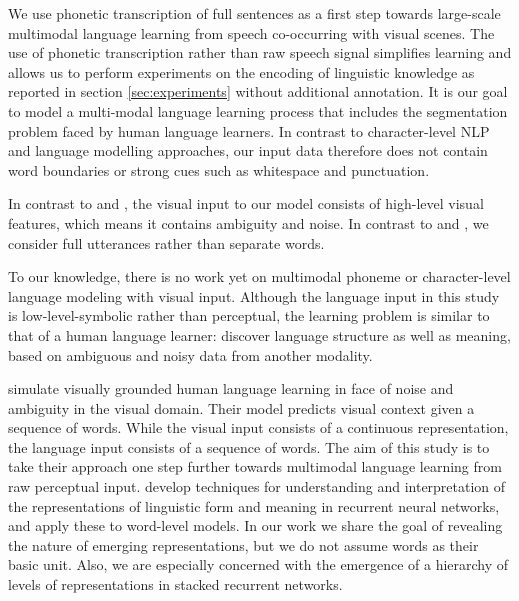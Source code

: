 We use phonetic transcription of full sentences as a first step
towards large-scale multimodal language learning from speech
co-occurring with visual scenes. 
The use of phonetic
transcription rather than raw speech signal simplifies learning
and allows us to perform experiments on the encoding of linguistic
knowledge as reported in section \ref{sec:experiments} without
additional annotation. It is our goal to model a multi-modal language learning process that includes the segmentation problem faced by human language learners. In contrast to character-level NLP and language modelling approaches, our input data therefore does not contain word boundaries or strong cues such as whitespace and punctuation.

In contrast to 
and , the visual input to our model consists
of high-level visual features, which means it contains ambiguity and
noise. In contrast to  and
, we consider full utterances rather than
separate words. 

To our knowledge, there is no work yet on multimodal phoneme or character-level language modeling with visual input.
Although the language input in this study is low-level-symbolic rather
than perceptual, the learning problem is similar to that of a human language learner: discover language structure as well as meaning, based on ambiguous and noisy data from another modality. 

 simulate visually grounded human
language learning in face of noise and ambiguity in the visual
domain. Their model predicts visual context given a sequence of words. While the visual input consists of a continuous representation, the language input consists of a sequence of words. The aim of this study is to take their approach one step further towards multimodal language learning from raw perceptual input. 
 develop techniques for understanding
and interpretation of the representations of linguistic form and
meaning in recurrent neural networks, and apply these to word-level
models. In our work we share the goal of revealing the nature of
emerging representations, but we do not assume words as their basic
unit. Also, we are especially concerned with the emergence of a
hierarchy of levels of representations in stacked recurrent networks. 